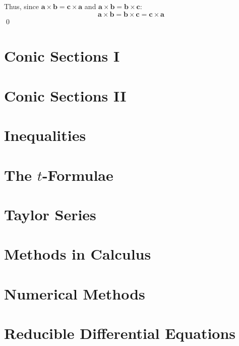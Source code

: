 {            Thus, since $\mathbf{a}\times\mathbf{b}=\mathbf{c}\times\mathbf{a}$ and $\mathbf{a}\times\mathbf{b}=\mathbf{b}\times\mathbf{c}$:
            \begin{equation}
                \mathbf{a}\times\mathbf{b}=\mathbf{b}\times\mathbf{c}=\mathbf{c}\times\mathbf{a}
            \end{equation} \qed
        }

        
    \newpage

\section{Conic Sections I} \label{}

    \newpage

\section{Conic Sections II} \label{}

    \newpage

\section{Inequalities} \label{}

    \newpage

\section{The \texorpdfstring{$t$}{\textit{t}}-Formulae} \label{}

    \newpage

\section{Taylor Series} \label{}

    \newpage

\section{Methods in Calculus} \label{}

    \newpage

\section{Numerical Methods} \label{}

    \newpage

\section{Reducible Differential Equations} \label{}

    \newpage